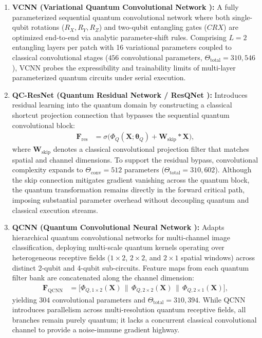 \documentclass[pdflatex,sn-mathphys-num]{sn-jnl}%
\theoremstyle{thmstyleone}%
\theoremstyle{thmstyletwo}%
\theoremstyle{thmstylethree}%
\begin{document}
\begin{enumerate}
    \item \textbf{VCNN (Variational Quantum Convolutional Network \cite{huang2021experimental}):} A fully parameterized sequential quantum convolutional network where both single-qubit rotations ($R_X, R_Y, R_Z$) and two-qubit entangling gates ($CRX$) are optimized end-to-end via analytic parameter-shift rules. Comprising $L=2$ entangling layers per patch with 16 variational parameters coupled to classical convolutional stages ($456$ convolutional parameters, $\Theta_{\mathrm{total}} = 310{,}546$), VCNN probes the expressibility and trainability limits of multi-layer parameterized quantum circuits under serial execution.

    \item \textbf{QC-ResNet (Quantum Residual Network / ResQNet \cite{kashif2024resqnets}):} Introduces residual learning into the quantum domain by constructing a classical shortcut projection connection that bypasses the sequential quantum convolutional block:
    \begin{align}
    \mathbf{F}_{\mathrm{res}} &= \sigma\Big( \Phi_Q(\mathbf{X}; \boldsymbol{\theta}_Q) + \mathbf{W}_{\mathrm{skip}} * \mathbf{X} \Big),
    \label{eq:qc_resnet_formulation}
    \end{align}
    where $\mathbf{W}_{\mathrm{skip}}$ denotes a classical convolutional projection filter that matches spatial and channel dimensions. To support the residual bypass, convolutional complexity expands to $\Theta_{\mathrm{conv}} = 512$ parameters ($\Theta_{\mathrm{total}} = 310{,}602$). Although the skip connection mitigates gradient vanishing across the quantum block, the quantum transformation remains directly in the forward critical path, imposing substantial parameter overhead without decoupling quantum and classical execution streams.

    \item \textbf{QCNN (Quantum Convolutional Neural Network \cite{chen2023qcnn}):} Adapts hierarchical quantum convolutional networks for multi-channel image classification, deploying multi-scale quantum kernels operating over heterogeneous receptive fields ($1 \times 2$, $2 \times 2$, and $2 \times 1$ spatial windows) across distinct 2-qubit and 4-qubit sub-circuits. Feature maps from each quantum filter bank are concatenated along the channel dimension:
    \begin{align}
    \mathbf{F}_{\mathrm{QCNN}} &= \Big[ \Phi_{Q, 1\times 2}(\mathbf{X}) \,\|\, \Phi_{Q, 2\times 2}(\mathbf{X}) \,\|\, \Phi_{Q, 2\times 1}(\mathbf{X}) \Big],
    \label{eq:qcnn_fusion}
    \end{align}
    yielding $304$ convolutional parameters and $\Theta_{\mathrm{total}} = 310{,}394$. While QCNN introduces parallelism across multi-resolution quantum receptive fields, all branches remain purely quantum; it lacks a concurrent classical convolutional channel to provide a noise-immune gradient highway.
\end{enumerate}
\end{document}
